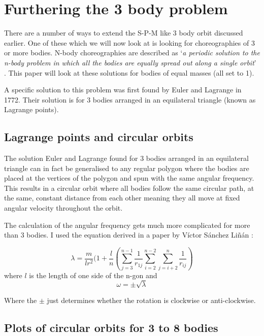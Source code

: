 \documentclass[11pt]{article}
\begin{document}
\section{Furthering the 3 body problem}
\raggedright

There are a number of ways to extend the S-P-M like 3 body orbit discussed earlier. One of these which we will now look at is looking for choreographies of 3 or more bodies. N-body choreographies are described as `\textit{a periodic solution to the n-body problem in which all the bodies are equally spread out along a single orbit}' \cite{Choreography}. This paper will look at these solutions for bodies of equal masses (all set to 1).

A specific solution to this problem was first found by Euler and Lagrange in 1772. Their solution is for 3 bodies arranged in an equilateral triangle (known as Lagrange points).

\subsection{Lagrange points and circular orbits}

The solution Euler and Lagrange found for 3 bodies arranged in an equilateral triangle can in fact be generalised to any regular polygon where the bodies are placed at the vertices of the polygon and spun with the same angular frequency. This results in a circular orbit where all bodies follow the same circular path, at the same, constant distance from each other meaning they all move at fixed angular velocity throughout the orbit.

The calculation of the angular frequency gets much more complicated for more than 3 bodies. I used the equation derived in a paper by V\'{i}ctor S\'{a}nchez Li\~{n}\'{a}n \cite{angspeed}:

$$
\lambda = \frac{m}{lr^2}(1+\frac{l}{n}(\sum_{j=3}^{n-1} \frac{1}{r_{1j}} \sum_{i=2}^{n-2} \sum_{j=i+2}^{n} \frac{1}{r_{ij}})
$$
where $l$ is the length of one side of the n-gon and
$$
\omega = \pm \sqrt{\lambda}
$$

Where the $\pm$ just determines whether the rotation is clockwise or anti-clockwise.

\subsection{Plots of circular orbits for 3 to 8 bodies}
\end{document}
